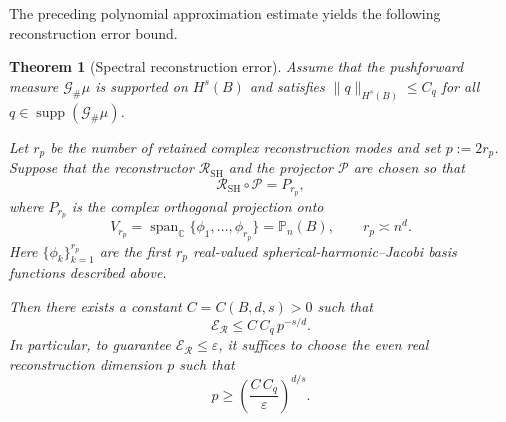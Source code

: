 \documentclass{article}
\numberwithin{equation}{section}
\theoremstyle{plain}
\newtheorem{theorem}{Theorem}[section]
\begin{document}
	The preceding polynomial approximation estimate yields the following reconstruction error bound.
	\begin{theorem}[Spectral reconstruction error]\label{thm:inverse-scattering-reconstruction}
		Assume that the pushforward measure 
		$\mathscr{G}_{\#}\mu$ is supported on $H^s(B)$ and satisfies
			$\|q\|_{H^s(B)}\le C_q$ for all
			$q\in\operatorname{supp}(\mathscr{G}_{\#}\mu)$.
		
			Let $r_p$ be the number of retained complex reconstruction modes
			and set $p:=2r_p$. Suppose that the reconstructor
			$\mathcal{R}_{\mathrm{SH}}$ and the projector $\mathcal P$ are chosen
			so that
			\begin{equation*}
				\mathcal R_{\mathrm{SH}}\circ\mathcal P=P_{r_p},
			\end{equation*}
			where $P_{r_p}$ is the complex orthogonal projection onto
			\begin{equation*}
				V_{r_p}
				=
				\operatorname{span}_{\mathbb C}
				\{\phi_1,\dots,\phi_{r_p}\}
				=
				\mathbb P_n(B),
				\qquad
				r_p\asymp n^d.
			\end{equation*}
			Here $\{\phi_k\}_{k=1}^{r_p}$ are the first $r_p$ real-valued
			spherical-harmonic--Jacobi basis functions described above.
		
		Then there exists a constant $C=C(B,d,s)>0$ such that
			\begin{equation*}
				\mathscr{E}_{\mathcal{R}}
				\le C\,C_q\,p^{-s/d}.
			\end{equation*}
			In particular, to guarantee
			$\mathscr E_{\mathcal R}\le \varepsilon$, it suffices to choose the
			even real reconstruction dimension $p$ such that
			\begin{equation*}
				p \ge
				\left(\frac{C\,C_q}{\varepsilon}\right)^{d/s}.
			\end{equation*}
		
	\end{theorem}
	
\end{document}
